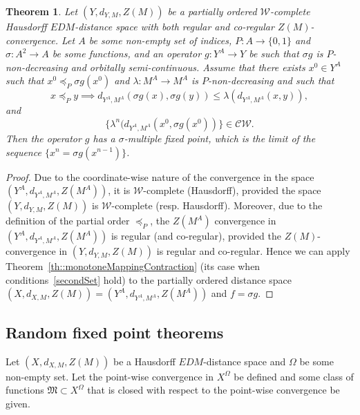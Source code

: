 \documentclass[12pt]{amsart}          %
\newtheorem{theorem}{Theorem}
\begin{document}
 \begin{theorem}
Let $(Y,d_{Y,M}, Z(M))$ be a partially ordered $\mathcal{W}$-complete Hausdorff $EDM$-distance space with  both regular and co-regular $Z(M)$-convergence. Let $A$ be some non-empty set of indices, $P\colon A\to \{0,1\}$ and $\sigma\colon A^2\to A$ be some functions, and an operator $g\colon Y^A\to Y$ be such that $\sigma g$ is $P$-non-decreasing and orbitally semi-continuous. Assume that there exists $x^0\in Y^A$ such that $x^0\preccurlyeq_P \sigma g(x^0)$ and $\lambda\colon M^A\to M^A$ is $P$-non-decreasing and such that 
$$
x\preccurlyeq_{P} y\implies d_{Y^A, M^A}(\sigma g(x), \sigma g(y)) \leq \lambda (d_{Y^A, M^A}(x,y)),
$$
and
$$
\{\lambda^n(d_{Y^A, M^A}(x^0, \sigma g(x^0))\}\in \mathcal{CW}.
$$
Then the operator $g$ has a $\sigma$-multiple fixed point, which is the limit of the sequence  $\{x^n = \sigma g(x^{n-1})\}$.
\end{theorem}
\begin{proof}
Due to the coordinate-wise nature of the convergence in the space $(Y^A, d_{Y^A, M^A}, Z(M^A))$, it is $\mathcal{W}$-complete (Hausdorff), provided the space $(Y, d_{Y, M},Z(M))$ is $\mathcal{W}$-complete (resp. Hausdorff). Moreover, due to the definition of the partial order $\preccurlyeq_P$, the $Z(M^A)$ convergence in $(Y^A, d_{Y^A, M^A}, Z(M^A))$ is regular  (and co-regular), provided the $Z(M)$-convergence in $(Y,d_{Y,M},Z(M))$ is regular and co-regular. Hence we can apply Theorem~\ref{th::monotoneMappingContraction} (its case when conditions~\ref{secondSet} hold) to the partially ordered distance space $(X,d_{X,M},Z(M)) = (Y^A, d_{Y^A, M^A}, Z(M^A))$ and $f = \sigma g$. \end{proof}
\subsection{Random fixed point theorems}
Let $(X, d_{X,M}, Z(M))$ be a Hausdorff $EDM$-distance space and  $\Omega$ be some non-empty set. 
Let the point-wise convergence in  $X^\Omega$ be defined and some class of functions $\mathfrak{M}\subset X^\Omega$ that is closed with respect to the point-wise convergence be given.
\end{document}
